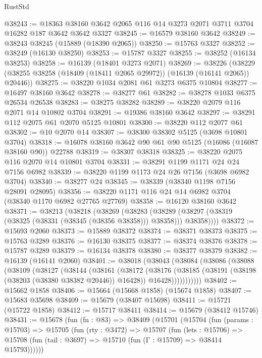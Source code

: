 \begin{lexlean}{RustStd}
\begin{coremodule}
@38243 := @18363 @38160 @3642 @2065 @116 @14 @3273 @2071 @3711 @3704 @16282 @187 @3642 @3642 @3327
@38245 := @16579 @38160 @3642
@38249 := @38243 @38245 (@15889 (@18390 @2065))
@38250 := @15763 @3327
@38252 := @38249 (@16130 @38250)
@38253 := @15787 @3327
@38255 := @38252 (@16134 @38253)
@38258 := @16139 (@18401 @3273 @2071)
@38269 := @38226
    (@38229 (@38255 @38258 (@18409 (@18411 @2065 @29972)) (@16139 (@16141 @2065)) @20446))
@38275 := @38220 @1034 @2081 @61 @3273 @6375 @10804
@38277 := @16497 @38160 @3642
@38278 := @38277 @61
@38282 := @38278 @1033 @6375 @26534 @26538
@38283 := @38275 @38282
@38289 := @38220 @2079 @116 @2071 @14 @10802 @3704
@38291 := @19386 @38160 @3642
@38297 := @38291 @112 @2075 @61 @2070 @5125 @10801
@38300 := @38220 @112 @2077 @61
@38302 := @10 @2070 @14
@38307 := @38300 @38302 @5125 (@3698 @10801 @3704)
@38318 := @16078 @38160 @3642 @90 @61 @90 @5125 (@16086 (@16087 @38160 @90)) @22788
@38319 := @38307 @38318
@38325 := @38220 @2075 @116 @2070 @14 @10801 @3704
@38331 := @38291 @1199 @1171 @24 @24 @7156 @6982
@38339 := @38220 @1199 @1173 @24 @26 @7156 (@3698 @6982 @3704)
@38340 := @38277 @24
@38345 := @38339 (@38340 @1198 @7156 @28091 @28095)
@38356 := @38220 @1171 @116 @24 @14 @6982 @3704 (@38340 @1170 @6982 @27765 @27769)
@38358 := @16120 @38160 @3642
@38371 := @38213
    (@38218
      (@38269
        (@38283
          (@38289 (@38297 (@38319 (@38325 (@38331 (@38345 (@38356 @38358))) @38358))) @38358))))
@38372 := @15693 @2060
@38373 := @15889 @38372
@38374 := @38371 @38373
@38375 := @15763 @3289
@38376 := @16130 @38375
@38377 := @38374 @38376
@38378 := @15787 @3289
@38379 := @16134 @38378
@38380 := @38377 @38379
@38382 := @16139 (@16141 @2060)
@38401 := @38018
    (@38043
      (@38084
        (@38086
          (@38088
            (@38109
              (@38127
                (@38144
                  (@38161
                    (@38172
                      (@38176
                        (@38185
                          (@38191 (@38198 (@38203 (@38380 @38382 @20446)) @16428))
                          @16428)))))))))))
@38402 := @15662 @1858
@38406 := @15664 (@15668 @1858) (@15674 @1858)
@38407 := @15683 @35698
@38409 := @15679 (@38407 @15698)
@38411 := @15721 (@15722 @1858)
@38412 := @15717 @38411
@38414 := @15679 (@38412 @15746)
@38431 := @15678
    (fun (fn : @83) =>
    @38409
      (@15701
        (@15704
          (fun (params : @15703) =>
          @15705
            (fun (rty : @3472) =>
            @15707
              (fun (lets : @15706) =>
              @15708 (fun (tail : @3697) => @15710 (fun (Γ : @15709) => @38414 @15793))))))

\end{coremodule}
\end{lexlean}
